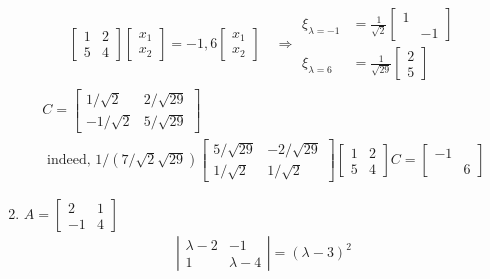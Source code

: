 \documentclass[twoside]{amsart}
\theoremstyle{plain}
\theoremstyle{definition}
\begin{document}
\begin{enumerate}
\[\begin{gathered}
  \left[ \begin{matrix} 1 & 2 \\ 5 & 4 \end{matrix} \right] \left[ \begin{matrix} x_1 \\ x_2 \end{matrix} \right] = -1,6 \left[ \begin{matrix} x_1 \\ x_2 \end{matrix} \right] \quad \Longrightarrow \begin{aligned} \xi_{\lambda = -1} & = \frac{1}{ \sqrt{2}} \left[ \begin{matrix} 1 \\ & -1 \end{matrix} \right] \\ \xi_{\lambda =6} & = \frac{1}{ \sqrt{29}} \left[ \begin{matrix} 2 \\ 5 \end{matrix} \right] \end{aligned} 
\end{gathered}
\]
\[
\begin{gathered}
  C = \left[ \begin{matrix} 1/\sqrt{2} & 2/\sqrt{29} \\ -1/\sqrt{2} & 5/\sqrt{29} \end{matrix} \right] \\
  \text{ indeed, } 1/(7/\sqrt{2}\sqrt{29}) \left[ \begin{matrix} 5/\sqrt{29} & -2/\sqrt{29} \\ 1/\sqrt{2} & 1/\sqrt{2} \end{matrix} \right] \left[ \begin{matrix} 1 & 2 \\ 5 & 4 \end{matrix} \right]C = \left[ \begin{matrix} -1 & \\ & 6 \end{matrix} \right] 
\end{gathered}
\]
\item $A = \left[ \begin{matrix} 2 & 1 \\ -1 & 4 \end{matrix} \right]$
\[
\begin{gathered}
  \left| \begin{matrix} \lambda - 2 & -1 \\ 1 & \lambda -4 \end{matrix} \right| = (\lambda -3)^2 \\  

\end{gathered}\]
\end{enumerate}
\end{document}
